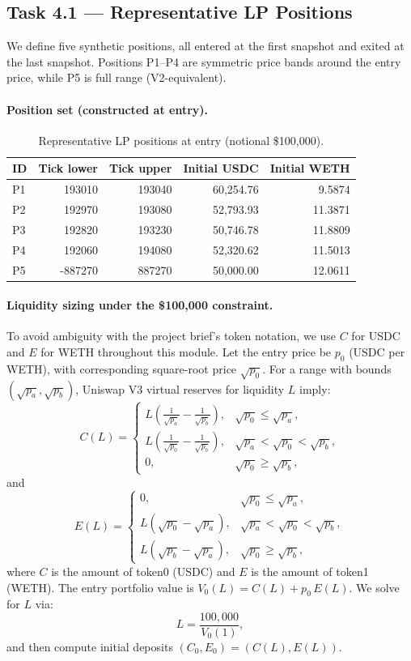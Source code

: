 \subsection{Task 4.1 --- Representative LP Positions}
\label{subsec:m4-task41}
We define five synthetic positions, all entered at the first snapshot and exited at the last snapshot. Positions P1--P4 are symmetric price bands around the entry price, while P5 is full range (V2-equivalent).

\paragraph{Position set (constructed at entry).}
\begin{table}[t]
    \centering
    \caption{Representative LP positions at entry (notional \$100{,}000).}
    \label{tab:m4-positions}
    \begin{tabular}{lrrrr}
        \hline
        ID & Tick lower & Tick upper & Initial USDC & Initial WETH \\
        \hline
        P1 & 193010 & 193040 & 60{,}254.76 & 9.5874 \\
        P2 & 192970 & 193080 & 52{,}793.93 & 11.3871 \\
        P3 & 192820 & 193230 & 50{,}746.78 & 11.8809 \\
        P4 & 192060 & 194080 & 52{,}320.62 & 11.5013 \\
        P5 & -887270 & 887270 & 50{,}000.00 & 12.0611 \\
        \hline
    \end{tabular}
\end{table}

\paragraph{Liquidity sizing under the \$100{,}000 constraint.}
To avoid ambiguity with the project brief's token notation, we use $C$ for USDC
and $E$ for WETH throughout this module. Let the entry price be $p_0$ (USDC per
WETH), with corresponding square-root price $\sqrt{p_0}$. For a range with
bounds $(\sqrt{p_a}, \sqrt{p_b})$, Uniswap V3 virtual reserves for liquidity
$L$ imply:
\[
C(L) =
\begin{cases}
L\left(\frac{1}{\sqrt{p_a}} - \frac{1}{\sqrt{p_b}}\right), & \sqrt{p_0} \le \sqrt{p_a}, \\
L\left(\frac{1}{\sqrt{p_0}} - \frac{1}{\sqrt{p_b}}\right), & \sqrt{p_a} < \sqrt{p_0} < \sqrt{p_b}, \\
0, & \sqrt{p_0} \ge \sqrt{p_b},
\end{cases}
\]
and
\[
E(L) =
\begin{cases}
0, & \sqrt{p_0} \le \sqrt{p_a}, \\
L(\sqrt{p_0} - \sqrt{p_a}), & \sqrt{p_a} < \sqrt{p_0} < \sqrt{p_b}, \\
L(\sqrt{p_b} - \sqrt{p_a}), & \sqrt{p_0} \ge \sqrt{p_b},
\end{cases}
\]
where $C$ is the amount of token0 (USDC) and $E$ is the amount of token1
(WETH). The entry portfolio value is $V_0(L) = C(L) + p_0\,E(L)$. We solve for
$L$ via:
\[
L = \frac{100{,}000}{V_0(1)},
\]
and then compute initial deposits $(C_0, E_0)=(C(L), E(L))$.


